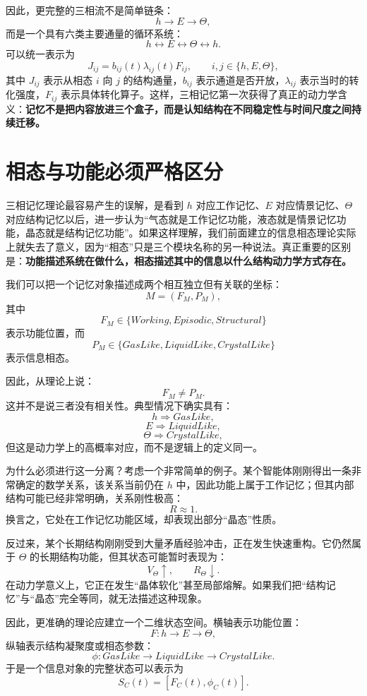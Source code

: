 因此，更完整的三相流不是简单链条：
\[
h\to E\to\Theta,
\]
而是一个具有六类主要通量的循环系统：
\[
\boxed{
h
\leftrightarrow
E
\leftrightarrow
\Theta
\leftrightarrow
h.
}
\]
可以统一表示为
\[
J_{ij}
=
b_{ij}(t)
\lambda_{ij}(t)
F_{ij},
\qquad
i,j\in\{h,E,\Theta\},
\]
其中 $J_{ij}$ 表示从相态 $i$ 向 $j$ 的结构通量，$b_{ij}$ 表示通道是否开放，$\lambda_{ij}$ 表示当时的转化强度，$F_{ij}$ 表示具体转化算子。这样，三相记忆第一次获得了真正的动力学含义：\textbf{记忆不是把内容放进三个盒子，而是认知结构在不同稳定性与时间尺度之间持续迁移。}


\section{相态与功能必须严格区分}

三相记忆理论最容易产生的误解，是看到 $h$ 对应工作记忆、$E$ 对应情景记忆、$\Theta$ 对应结构记忆以后，进一步认为“气态就是工作记忆功能，液态就是情景记忆功能，晶态就是结构记忆功能”。如果这样理解，我们前面建立的信息相态理论实际上就失去了意义，因为“相态”只是三个模块名称的另一种说法。真正重要的区别是：\textbf{功能描述系统在做什么，相态描述其中的信息以什么结构动力学方式存在。}

我们可以把一个记忆对象描述成两个相互独立但有关联的坐标：
\[
M
=
\left(
F_M,
P_M
\right),
\]
其中
\[
F_M
\in
\{
Working,
Episodic,
Structural
\}
\]
表示功能位置，而
\[
P_M
\in
\{
GasLike,
LiquidLike,
CrystalLike
\}
\]
表示信息相态。

因此，从理论上说：
\[
F_M
\neq
P_M.
\]
这并不是说三者没有相关性。典型情况下确实具有：
\[
h\Rightarrow GasLike,
\]
\[
E\Rightarrow LiquidLike,
\]
\[
\Theta\Rightarrow CrystalLike,
\]
但这是动力学上的高概率对应，而不是逻辑上的定义同一。

为什么必须进行这一分离？考虑一个非常简单的例子。某个智能体刚刚得出一条非常确定的数学关系，该关系当前仍在 $h$ 中，因此功能上属于工作记忆；但其内部结构可能已经非常明确，关系刚性极高：
\[
R\approx 1.
\]
换言之，它处在工作记忆功能区域，却表现出部分“晶态”性质。

反过来，某个长期结构刚刚受到大量矛盾经验冲击，正在发生快速重构。它仍然属于 $\Theta$ 的长期结构功能，但其状态可能暂时表现为：
\[
V_\Theta\uparrow,
\qquad
R_\Theta\downarrow.
\]
在动力学意义上，它正在发生“晶体软化”甚至局部熔解。如果我们把“结构记忆”与“晶态”完全等同，就无法描述这种现象。

因此，更准确的理论应建立一个二维状态空间。横轴表示功能位置：
\[
F:
h
\rightarrow
E
\rightarrow
\Theta,
\]
纵轴表示结构凝聚度或相态参数：
\[
\phi:
GasLike
\rightarrow
LiquidLike
\rightarrow
CrystalLike.
\]
于是一个信息对象的完整状态可以表示为
\[
S_C(t)
=
\left[
F_C(t),
\phi_C(t)
\right].
\]

